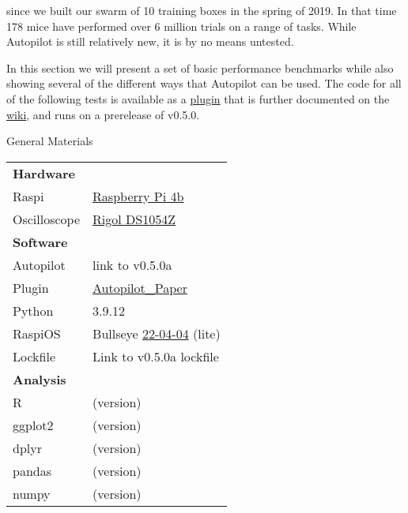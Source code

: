 
 since we built our swarm of 10 training boxes in the spring of 2019. In that time 178 mice have performed over 6 million trials on a range of tasks. While Autopilot is still relatively new, it is by no means untested.

In this section we will present a set of basic performance benchmarks while also showing several of the different ways that Autopilot can be used. The code for all of the following tests is available as a \href{https://github.com/auto-pi-lot/plugin-paper}{plugin} that is further documented on the \href{https://wiki.auto-pi-lot.com/index.php/Plugin:Autopilot_Paper}{wiki}, and runs on a prerelease of v0.5.0. 

\begin{margintable}[-0.5cm]
\caption{General Materials}
\label{tab:materials}
\noindent\begin{tabularx}{\linewidth}{lX}%
\toprule
\textbf{Hardware} & \\
Raspi & \href{https://www.raspberrypi.org/products/raspberry-pi-4-model-b/}{Raspberry Pi 4b}\\
Oscilloscope & \href{https://wiki.auto-pi-lot.com/index.php/Rigol\_DS1054Z}{Rigol DS1054Z} \\
\midrule
\textbf{Software} & \\
Autopilot & link to v0.5.0a \\
Plugin & \href{https://wiki.auto-pi-lot.com/index.php/Plugin:Autopilot\_Paper}{Autopilot\_Paper} \\
Python & 3.9.12 \\
RaspiOS & Bullseye \href{https://downloads.raspberrypi.org/raspios_lite_armhf/images/raspios\_lite\_armhf-2022-04-07/}{22-04-04} (lite) \\
Lockfile & Link to v0.5.0a lockfile \\
\midrule
\textbf{Analysis} & \\
R & (version) \\
ggplot2 & (version) \\
dplyr & (version) \\
pandas & (version) \\
numpy & (version) \\ 
\bottomrule
\end{tabularx}
\end{margintable}

